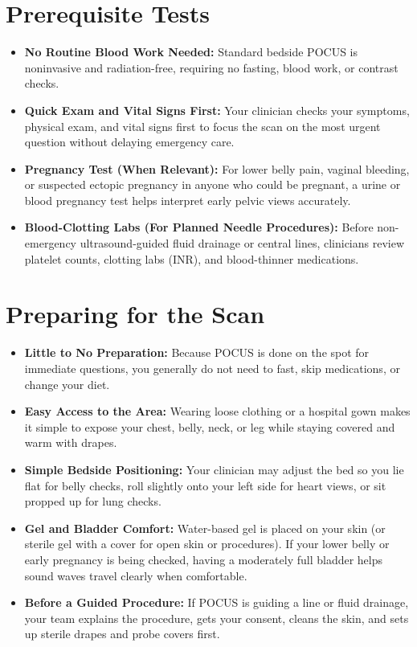 \section{Prerequisite Tests}

\begin{itemize}
    \item \textbf{No Routine Blood Work Needed:} Standard bedside POCUS is noninvasive and radiation-free, requiring no fasting, blood work, or contrast checks.
    \item \textbf{Quick Exam and Vital Signs First:} Your clinician checks your symptoms, physical exam, and vital signs first to focus the scan on the most urgent question without delaying emergency care.
    \item \textbf{Pregnancy Test (When Relevant):} For lower belly pain, vaginal bleeding, or suspected ectopic pregnancy in anyone who could be pregnant, a urine or blood pregnancy test helps interpret early pelvic views accurately.
    \item \textbf{Blood-Clotting Labs (For Planned Needle Procedures):} Before non-emergency ultrasound-guided fluid drainage or central lines, clinicians review platelet counts, clotting labs (INR), and blood-thinner medications.
\end{itemize}

\section{Preparing for the Scan}

\begin{itemize}
    \item \textbf{Little to No Preparation:} Because POCUS is done on the spot for immediate questions, you generally do not need to fast, skip medications, or change your diet.
    \item \textbf{Easy Access to the Area:} Wearing loose clothing or a hospital gown makes it simple to expose your chest, belly, neck, or leg while staying covered and warm with drapes.
    \item \textbf{Simple Bedside Positioning:} Your clinician may adjust the bed so you lie flat for belly checks, roll slightly onto your left side for heart views, or sit propped up for lung checks.
    \item \textbf{Gel and Bladder Comfort:} Water-based gel is placed on your skin (or sterile gel with a cover for open skin or procedures). If your lower belly or early pregnancy is being checked, having a moderately full bladder helps sound waves travel clearly when comfortable.
    \item \textbf{Before a Guided Procedure:} If POCUS is guiding a line or fluid drainage, your team explains the procedure, gets your consent, cleans the skin, and sets up sterile drapes and probe covers first.
\end{itemize}


